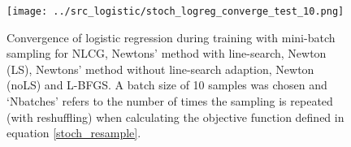 \documentclass[11pt,twocolumn]{article}
\begin{document}
\newpage

  




%


\begin{figure}[!ht]
\centering
\texttt{[image: ../src\_logistic/stoch\_logreg\_converge\_test\_10.png]}
\caption{Convergence of logistic regression during training with mini-batch sampling for NLCG, Newtons' method with line-search, Newton (LS),  Newtons' method without line-search adaption,  Newton (noLS) and L-BFGS. A batch size of 10 samples was chosen and `Nbatches' refers to the number of times the sampling is repeated (with reshuffling) when calculating the objective function defined in equation \ref{stoch_resample}.}\label{Stoch_Logistic_regression_conv}
\end{figure}
\end{document}
